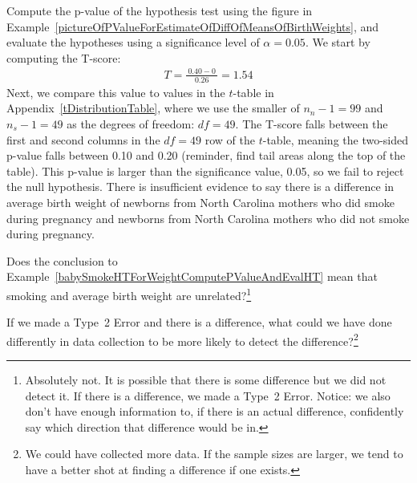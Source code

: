 {\begin{example}{Compute the p-value of the hypothesis test using the figure in Example~\ref{pictureOfPValueForEstimateOfDiffOfMeansOfBirthWeights}, and evaluate the hypotheses using a significance level of $\alpha=0.05$.} \label{babySmokeHTForWeightComputePValueAndEvalHT}
We start by computing the T-score:
\begin{eqnarray*}
T = \frac{\ 0.40 - 0\ }{0.26} = 1.54
\end{eqnarray*}
Next, we compare this value to values in the $t$-table in Appendix~\vref{tDistributionTable}, where we use the smaller of $n_n - 1 = 99$ and $n_s - 1 = 49$ as the degrees of freedom: $df = 49$. The T-score falls between the first and second columns in the $df = 49$ row of the $t$-table, meaning the two-sided p-value falls between 0.10 and 0.20 (reminder, find tail areas along the top of the table). This p-value is larger than the significance value, 0.05, so we fail to reject the null hypothesis. There is insufficient evidence to say there is a difference in average birth weight of newborns from North Carolina mothers who did smoke during pregnancy and newborns from North Carolina mothers who did not smoke during pregnancy.
\end{example}

\begin{exercise}
Does the conclusion to Example~\ref{babySmokeHTForWeightComputePValueAndEvalHT} mean that smoking and average birth weight are unrelated?\footnote{Absolutely not. It is possible that there is some difference but we did not detect it. If there is a difference, we made a Type~2 Error. Notice: we also don't have enough information to, if there is an actual difference, confidently say which direction that difference would be in.}
\end{exercise}

\begin{exercise} \label{babySmokeHTIDingHowToDetectDifferences}
If we made a Type~2 Error and there is a difference, what could we have done differently in data collection to be more likely to detect the difference?\footnote{We could have collected more data. If the sample sizes are larger, we tend to have a better shot at finding a difference if one exists.}
\end{exercise}

\textC{\newpage}

}
